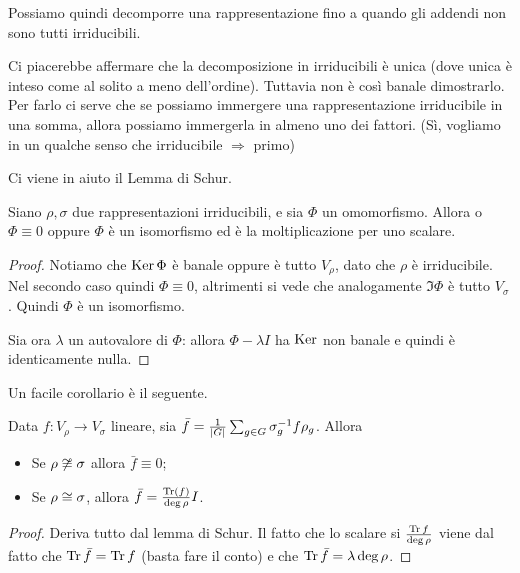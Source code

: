 \documentclass[a4paper,10pt,oneside]{math_article}
\newcommand{\id}{I}
\begin{document}
    
    Possiamo quindi decomporre una rappresentazione fino a quando gli addendi non sono tutti irriducibili.
    
    Ci piacerebbe affermare che la decomposizione in irriducibili è unica (dove unica è inteso come al solito a meno dell'ordine). Tuttavia non è così banale dimostrarlo. Per farlo ci serve che se possiamo immergere una rappresentazione irriducibile in una somma, allora possiamo immergerla in almeno uno dei fattori. (Sì, vogliamo in un qualche senso che irriducibile $\Rightarrow$ primo)
    
    Ci viene in aiuto il Lemma di Schur.
    
    \begin{mytheorem}
     Siano $\rho,\sigma$ due rappresentazioni irriducibili, e sia $\Phi$ un omomorfismo. Allora o $\Phi \equiv 0$ oppure $\Phi$ è un isomorfismo ed è la moltiplicazione per uno scalare.
    \end{mytheorem}
    \begin{proof}
     Notiamo che $\operatorname{Ker} \Phi$ è banale oppure è tutto $V_\rho$, dato che $\rho$ è irriducibile. Nel secondo caso quindi $\Phi\equiv 0$, altrimenti si vede che analogamente $\Im \Phi$ è tutto $V_\sigma$. Quindi $\Phi$ è un isomorfismo.
     
     Sia ora $\lambda$ un autovalore di $\Phi$: allora $\Phi-\lambda\id$ ha $\operatorname{Ker}$ non banale e quindi è identicamente nulla.
    \end{proof}
    
    Un facile corollario è il seguente.
    \begin{mycor}
     Data $f: V_\rho \rightarrow V_\sigma$ lineare, sia $\bar f = \frac 1{\left|G\right|} \sum_{g\in G} \sigma_g^{-1} f \rho_g$. Allora
     \begin{itemize}
      \item Se $\rho \not \cong \sigma$ allora $\bar f\equiv 0$;
      \item Se $\rho \cong \sigma$, allora $\bar f = \frac{\Tr(f)}{\deg \rho}\id$.
     \end{itemize}
    \end{mycor}
    \begin{proof}
     Deriva tutto dal lemma di Schur. Il fatto che lo scalare si $\frac{\operatorname{Tr} f}{\deg \rho}$ viene dal fatto che $\operatorname{Tr} \bar f = \operatorname{Tr} f$ (basta fare il conto) e che $\operatorname{Tr} \bar f = \lambda \deg \rho$.
    \end{proof}
\end{document}
